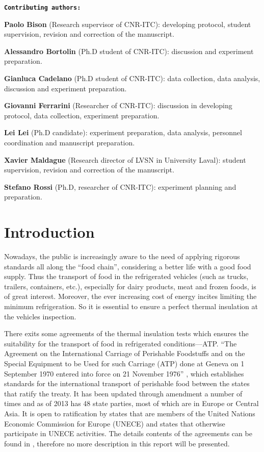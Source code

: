\textbf{\texttt{Contributing authors:}}

\textbf{Paolo Bison} (Research supervisor of CNR-ITC): developing protocol, student supervision, revision and correction of the manuscript. 

\textbf{Alessandro Bortolin} (Ph.D student of CNR-ITC): discussion and experiment preparation.

\textbf{Gianluca Cadelano} (Ph.D student of CNR-ITC): data collection, data analysis, discussion and experiment preparation.

\textbf{Giovanni Ferrarini} (Researcher of CNR-ITC): discussion in developing protocol, data collection, experiment preparation.

\textbf{\textsf{Lei Lei}} (Ph.D candidate):  experiment preparation, data analysis,  personnel coordination and manuscript preparation.

\textbf{Xavier Maldague} (Research director of LVSN in University Laval): student supervision, revision and correction of the manuscript.

\textbf{Stefano Rossi} (Ph.D, researcher of CNR-ITC): experiment planning and preparation.



\newpage
\section{Introduction}
Nowadays, the public is increasingly aware to the need of applying rigorous standards all along the ``food chain'', considering a better life with a good food supply.  Thus the transport of food in the refrigerated vehicles (such as trucks, trailers, containers, etc.), especially for dairy products, meat and frozen foods, is of great interest. Moreover, the ever increasing cost of energy incites limiting the minimum refrigeration. So it is essential to ensure a perfect thermal insulation at the vehicles inspection. 

There exits some agreements of the thermal insulation tests which ensures the suitability for the transport of food in refrigerated conditions---ATP.
``The Agreement on the International Carriage of Perishable Foodstuffs and on the Special Equipment to be Used for such Carriage (ATP) done at Geneva on 1 September 1970 entered into force on 21 November 1976'' \citep{Geneva1970}, which establishes standards for the international transport of perishable food between the states that ratify the treaty. It has been updated through amendment a number of times and as of 2013 has 48 state parties, most of which are in Europe or Central Asia. It is open to ratification by states that are members of the United Nations Economic Commission for Europe (UNECE) and states that otherwise participate in UNECE activities\citep{ATP_wiki}.
The details contents of the agreements can be found in \citep{ATP_wiki, rossi2009k}, therefore no more description in this report will be presented.

